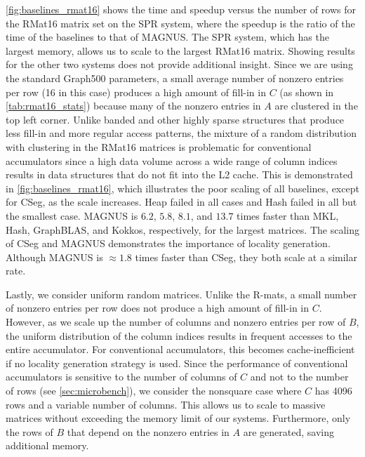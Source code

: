\autoref{fig:baselines_rmat16} shows the time and speedup versus the number of rows for the RMat16 matrix set on the SPR system, where the speedup is the ratio of the time of the baselines to that of MAGNUS.
The SPR system, which has the largest memory, allows us to scale to the largest RMat16 matrix.
Showing results for the other two systems does not provide additional insight.
Since we are using the standard Graph500 parameters, a small average number of nonzero entries per row (16 in this case) produces a high amount of fill-in in $C$ (as shown in \autoref{tab:rmat16_stats}) because many of the nonzero entries in $A$ are clustered in the top left corner.
Unlike banded and other highly sparse structures that produce less fill-in and more regular access patterns, the mixture of a random distribution with clustering in the RMat16 matrices is problematic for conventional accumulators since a high data volume across a wide range of column indices results in data structures that do not fit into the L2 cache.
This is demonstrated in \autoref{fig:baselines_rmat16}, which illustrates the poor scaling of all baselines, except for CSeg, as the scale increases.
Heap failed in all cases and Hash failed in all but the smallest case.
MAGNUS is $6.2$, $5.8$, $8.1$, and $13.7$ times faster than MKL, Hash, GraphBLAS, and Kokkos, respectively, for the largest matrices.
The scaling of CSeg and MAGNUS demonstrates the importance of locality generation.
Although MAGNUS is $\approx1.8$ times faster than CSeg, they both scale at a similar rate.


Lastly, we consider uniform random matrices.
Unlike the R-mats, a small number of nonzero entries per row does not produce a high amount of fill-in in $C$. 
However, as we scale up the number of columns and nonzero entries per row of $B$, the uniform distribution of the column indices results in frequent accesses to the entire accumulator.
For conventional accumulators, this becomes cache-inefficient if no locality generation strategy is used.
Since the performance of conventional accumulators is sensitive to the number of columns of $C$ and not to the number of rows (see \autoref{sec:microbench}), we consider the nonsquare case where $C$ has 4096 rows and a variable number of columns.
This allows us to scale to massive matrices without exceeding the memory limit of our systems.
Furthermore, only the rows of $B$ that depend on the nonzero entries in $A$ are generated, saving additional memory.



